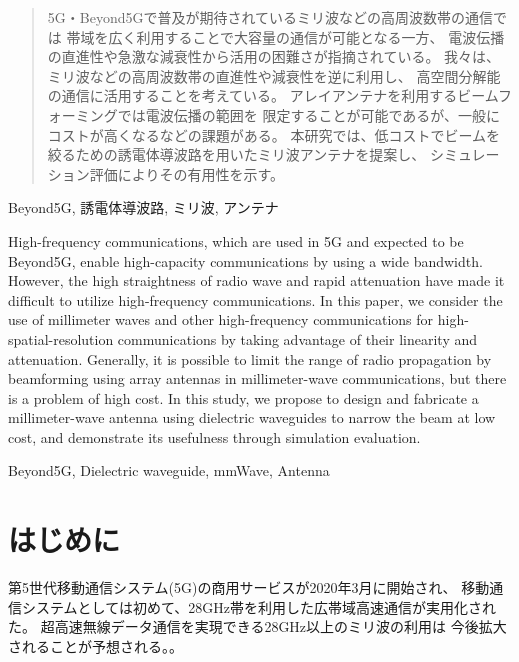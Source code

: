 \documentclass[technicalreport]{ieicej}
\begin{document}
\begin{abstract}
  5G・Beyond5Gで普及が期待されているミリ波などの高周波数帯の通信では
  帯域を広く利用することで大容量の通信が可能となる一方、
  電波伝播の直進性や急激な減衰性から活用の困難さが指摘されている。
  我々は、ミリ波などの高周波数帯の直進性や減衰性を逆に利用し、
  高空間分解能の通信に活用することを考えている。
  アレイアンテナを利用するビームフォーミングでは電波伝播の範囲を
  限定することが可能であるが、一般にコストが高くなるなどの課題がある。
  本研究では、低コストでビームを絞るための誘電体導波路を用いたミリ波アンテナを提案し、
  シミュレーション評価によりその有用性を示す。
\end{abstract}
\begin{keyword}
Beyond5G, 誘電体導波路, ミリ波, アンテナ
\end{keyword}
\begin{eabstract}
High-frequency communications,
which are used in 5G and expected to be Beyond5G,
enable high-capacity communications by using a wide bandwidth.
However, the high straightness of radio wave
and rapid attenuation
have made it difficult to utilize high-frequency communications.
In this paper, we consider the use of millimeter waves and
other high-frequency communications for high-spatial-resolution communications
by taking advantage of their linearity and attenuation.
Generally, it is possible to limit the range of radio propagation by
beamforming using array antennas in millimeter-wave communications,
but there is a problem of high cost.
In this study,
we propose to design and fabricate a millimeter-wave antenna using
dielectric waveguides to narrow the beam at low cost,
and demonstrate its usefulness through simulation evaluation.
\end{eabstract}
\begin{ekeyword}
Beyond5G, Dielectric waveguide, mmWave, Antenna
\end{ekeyword}
\maketitle

\section{はじめに}

第5世代移動通信システム(5G)の商用サービスが2020年3月に開始され、
移動通信システムとしては初めて、28GHz帯を利用した広帯域高速通信が実用化された。
超高速無線データ通信を実現できる28GHz以上のミリ波の利用は
今後拡大されることが予想される。\cite{docomo_6G_white_paper}。
\end{document}
